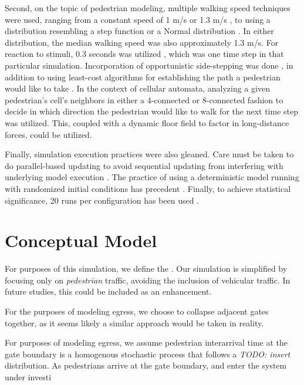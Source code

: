 \documentclass[12pt]{article}
\begin{document}
Second, on the topic of pedestrian modeling, multiple walking speed techniques
were used, ranging from a constant speed of 1 m/s \cite{weifeng2003simulation}
or 1.3 m/s \cite{burstedde2001simulation}, to using a distribution resembling a
step function \cite{blue2001cellular} or a Normal distribution
\cite{klupfel2005models}. In either distribution, the median walking speed was
also approximately 1.3 m/s. For reaction to stimuli, 0.3 seconds was utilized
\cite{burstedde2001simulation}, which was one time step in that particular
simulation. Incorporation of opportunistic side-stepping was done
\cite{blue2001cellular}, in addition to using least-cost algorithms for
establishing the path a pedestrian would like to take
\cite{fang2011hierarchical}. In the context of cellular automata, analyzing a
given pedestrian's cell's neighbors in either a 4-connected
\cite{weifeng2003simulation} or 8-connected fashion
\cite{burstedde2001simulation} to decide in which direction the pedestrian would
like to walk for the next time step was utilized. This, coupled with a dynamic
floor field \cite{burstedde2001simulation} to factor in long-distance forces,
could be utilized.

Finally, simulation execution practices were also gleaned. Care must be taken
to do parallel-based updating to avoid sequential updating from interfering with
underlying model execution \cite{blue2001cellular}. The practice of using
a deterministic model running with randomized initial conditions has precedent
\cite{biham1992self}. Finally, to achieve statistical significance, 20 runs per
configuration has been used \cite{blue2001cellular}.

\section{Conceptual Model}
For purposes of this simulation,
we define the . Our simulation is simplified by focusing only on
\textit{pedestrian} traffic, avoiding the inclusion of vehicular traffic. In
future studies, this could be included as an enhancement.

For the purposes of modeling egress, we choose to collapse
adjacent gates together, as it seems likely a similar approach would be taken
in reality.

For purposes of modeling egress, we assume pedestrian interarrival time at the
gate boundary is a homogenous stochastic process that follows a \textit{TODO: insert}
distribution. As pedestrians arrive at the gate boundary, and enter the system
under investi

{}

\end{document}
